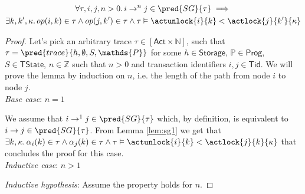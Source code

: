 \begin{lem}
	\label{lem:sg2}
	\begin{gather*}
	\forall \tau, i, j, n > 0 \ldotp i \rightarrow^n j \in \pred{SG}{\tau} \implies \\
	\exists k, k', \kappa \ldotp op(i, k) \in \tau \land op(j, k') \in \tau \land \tau \vDash \actunlock{i}{k} < \actlock{j}{k'}{\kappa}
	\end{gather*}
	
	{\parindent0pt
	\begin{proof}
	Let's pick an arbitrary trace $\tau \in [\mathsf{Act} \times \mathds{N}]$, such that $\tau = \pred{trace}{h, \emptyset, S, \mathds{P}}$ for some $h \in \mathsf{Storage}$, $\mathds{P} \in \mathsf{Prog}$, $S \in \mathsf{TState}$, $n \in \mathds{Z}$ such that $n > 0$ and transaction identifiers $i, j \in \mathsf{Tid}$. We will prove the lemma by induction on $n$, i.e. the length of the path from node $i$ to node $j$. \\
	
	\textit{Base case}: $n = 1$
	
	We assume that $i \rightarrow^1 j \in \pred{SG}{\tau}$ which, by definition, is equivalent to $i \rightarrow j \in \pred{SG}{\tau}$. From Lemma \ref{lem:sg1} we get that $\exists k, \kappa \ldotp \alpha_i(k) \in \tau \land \alpha_j(k) \in \tau \land \tau \vDash \actunlock{i}{k} < \actlock{j}{k}{\kappa}$ that concludes the proof for this case. \\
	
	\textit{Inductive case}: $n > 1$
	
	\textit{Inductive hypothesis}: Assume the property holds for $n$.
	

\end{proof}}
\end{lem}
